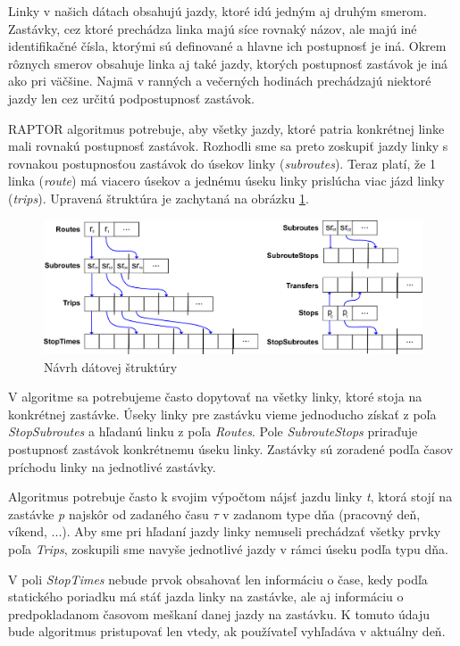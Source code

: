 Linky v našich dátach obsahujú jazdy, ktoré idú jedným aj druhým smerom. Zastávky, cez ktoré prechádza linka majú síce rovnaký názov, ale majú iné identifikačné čísla, ktorými sú definované a hlavne ich postupnosť je iná. Okrem rôznych smerov obsahuje linka aj také jazdy, ktorých postupnosť zastávok je iná ako pri väčšine. Najmä v ranných a večerných hodinách prechádzajú niektoré jazdy len cez určitú podpostupnosť zastávok. 

RAPTOR algoritmus potrebuje, aby všetky jazdy, ktoré patria konkrétnej linke mali rovnakú postupnosť zastávok. Rozhodli sme sa preto zoskupiť jazdy linky s rovnakou postupnosťou zastávok do úsekov linky (\textit{subroutes}). Teraz platí, že 1 linka (\textit{route}) má viacero úsekov a jednému úseku linky prislúcha viac jázd linky (\textit{trips}). Upravená štruktúra je zachytaná na obrázku \ref{fig:my-datastructure}.

\begin{figure}[H]
\centerline{\includegraphics[width=1.0\textwidth]{images/my-structure}}
\caption[Návrh dátovej štruktúry]{Návrh dátovej štruktúry}
\label{fig:my-datastructure}
\end{figure}

V algoritme sa potrebujeme často dopytovať na všetky linky, ktoré stoja na konkrétnej zastávke. Úseky linky pre zastávku vieme jednoducho získať z poľa \textit{StopSubroutes} a hľadanú linku z poľa \textit{Routes}. Pole \textit{SubrouteStops} priraďuje postupnosť zastávok konkrétnemu úseku linky. Zastávky sú zoradené podľa časov príchodu linky na jednotlivé zastávky.

Algoritmus potrebuje často k svojim výpočtom nájsť jazdu linky \textit{t}, ktorá stojí na zastávke \textit{p} najskôr od zadaného času $\tau$ v zadanom type dňa (pracovný deň, víkend, ...). 
Aby sme pri hľadaní jazdy linky nemuseli prechádzať všetky prvky poľa \textit{Trips}, zoskupili sme navyše jednotlivé jazdy v rámci úseku podľa typu dňa.

V poli \textit{StopTimes} nebude prvok obsahovať len informáciu o čase, kedy podľa statického poriadku má stáť jazda linky na zastávke, ale aj informáciu o predpokladanom časovom meškaní danej jazdy na zastávku. K tomuto údaju bude algoritmus pristupovať len vtedy, ak používateľ vyhľadáva v aktuálny deň. 

